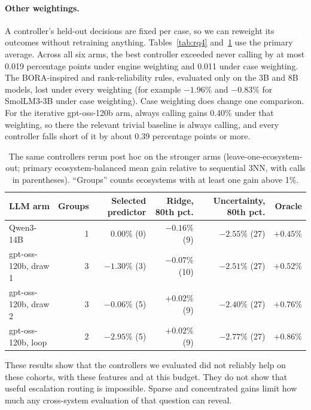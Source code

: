 \paragraph{Other weightings.} A controller's held-out decisions are fixed per case, so we can reweight its outcomes without retraining anything. Tables~\ref{tab:rq4} and~\ref{tab:routers-strong} use the primary average. Across all six arms, the best controller exceeded never calling by at most 0.019 percentage points under engine weighting and 0.011 under case weighting. The BORA-inspired and rank-reliability rules, evaluated only on the 3B and 8B models, lost under every weighting (for example $-1.96\%$ and $-0.83\%$ for SmolLM3-3B under case weighting). Case weighting does change one comparison. For the iterative gpt-oss-120b arm, always calling gains 0.40\% under that weighting, so there the relevant trivial baseline is always calling, and every controller falls short of it by about 0.39 percentage points or more.

\begin{table}[t]
\centering
\caption{The same controllers rerun post hoc on the stronger arms (leave-one-ecosystem-out; primary ecosystem-balanced mean gain relative to sequential 3NN, with calls in parentheses). ``Groups'' counts ecosystems with at least one gain above 1\%.}
\label{tab:routers-strong}
\small
\setlength{\tabcolsep}{4pt}
\begin{tabular}{lrrrrr}
\toprule
LLM arm & Groups & Selected predictor & Ridge, 80th pct. & Uncertainty, 80th pct. & Oracle \\
\midrule
Qwen3-14B & 1 & $0.00\%$ (0) & $-0.16\%$ (9) & $-2.55\%$ (27) & $+0.45\%$ \\
gpt-oss-120b, draw 1 & 3 & $-1.30\%$ (3) & $-0.07\%$ (10) & $-2.51\%$ (27) & $+0.52\%$ \\
gpt-oss-120b, draw 2 & 3 & $-0.06\%$ (5) & $+0.02\%$ (9) & $-2.40\%$ (27) & $+0.76\%$ \\
gpt-oss-120b, loop & 2 & $-2.95\%$ (5) & $+0.02\%$ (9) & $-2.77\%$ (27) & $+0.86\%$ \\
\bottomrule
\end{tabular}
\end{table}

These results show that the controllers we evaluated did not reliably help on these cohorts, with these features and at this budget. They do not show that useful escalation routing is impossible. Sparse and concentrated gains limit how much any cross-system evaluation of that question can reveal.

